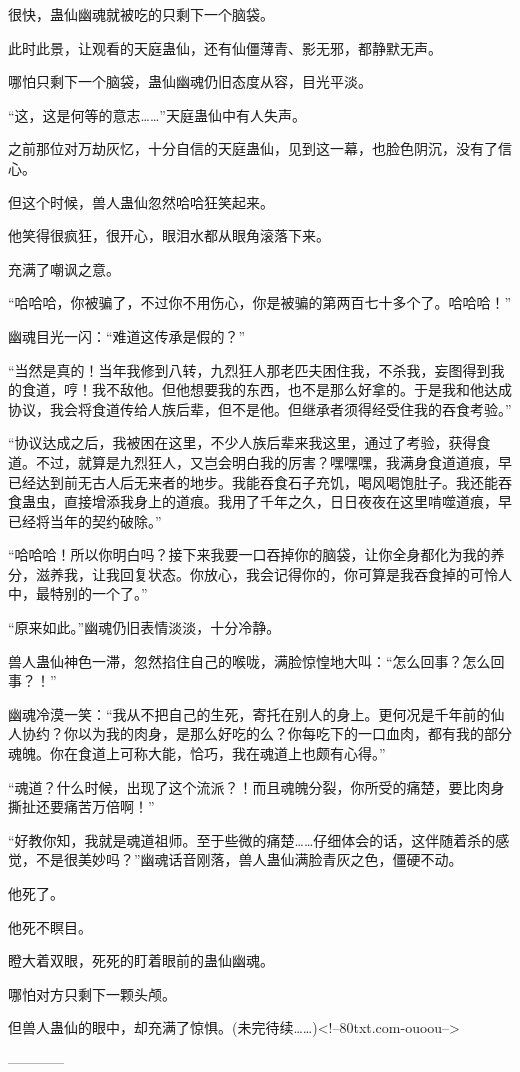 \begin{this_body}
很快，蛊仙幽魂就被吃的只剩下一个脑袋。

此时此景，让观看的天庭蛊仙，还有仙僵薄青、影无邪，都静默无声。

哪怕只剩下一个脑袋，蛊仙幽魂仍旧态度从容，目光平淡。

“这，这是何等的意志……”天庭蛊仙中有人失声。

之前那位对万劫灰忆，十分自信的天庭蛊仙，见到这一幕，也脸色阴沉，没有了信心。

但这个时候，兽人蛊仙忽然哈哈狂笑起来。

他笑得很疯狂，很开心，眼泪水都从眼角滚落下来。

充满了嘲讽之意。

“哈哈哈，你被骗了，不过你不用伤心，你是被骗的第两百七十多个了。哈哈哈！”

幽魂目光一闪：“难道这传承是假的？”

“当然是真的！当年我修到八转，九烈狂人那老匹夫困住我，不杀我，妄图得到我的食道，哼！我不敌他。但他想要我的东西，也不是那么好拿的。于是我和他达成协议，我会将食道传给人族后辈，但不是他。但继承者须得经受住我的吞食考验。”

“协议达成之后，我被困在这里，不少人族后辈来我这里，通过了考验，获得食道。不过，就算是九烈狂人，又岂会明白我的厉害？嘿嘿嘿，我满身食道道痕，早已经达到前无古人后无来者的地步。我能吞食石子充饥，喝风喝饱肚子。我还能吞食蛊虫，直接增添我身上的道痕。我用了千年之久，日日夜夜在这里啃噬道痕，早已经将当年的契约破除。”

“哈哈哈！所以你明白吗？接下来我要一口吞掉你的脑袋，让你全身都化为我的养分，滋养我，让我回复状态。你放心，我会记得你的，你可算是我吞食掉的可怜人中，最特别的一个了。”

“原来如此。”幽魂仍旧表情淡淡，十分冷静。

兽人蛊仙神色一滞，忽然掐住自己的喉咙，满脸惊惶地大叫：“怎么回事？怎么回事？！”

幽魂冷漠一笑：“我从不把自己的生死，寄托在别人的身上。更何况是千年前的仙人协约？你以为我的肉身，是那么好吃的么？你每吃下的一口血肉，都有我的部分魂魄。你在食道上可称大能，恰巧，我在魂道上也颇有心得。”

“魂道？什么时候，出现了这个流派？！而且魂魄分裂，你所受的痛楚，要比肉身撕扯还要痛苦万倍啊！”

“好教你知，我就是魂道祖师。至于些微的痛楚……仔细体会的话，这伴随着杀的感觉，不是很美妙吗？”幽魂话音刚落，兽人蛊仙满脸青灰之色，僵硬不动。

他死了。

他死不瞑目。

瞪大着双眼，死死的盯着眼前的蛊仙幽魂。

哪怕对方只剩下一颗头颅。

但兽人蛊仙的眼中，却充满了惊惧。(未完待续……)<!--80txt.com-ouoou-->

------------

\end{this_body}

